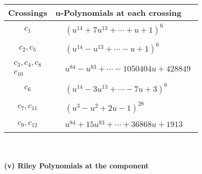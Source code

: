 \documentclass[1p]{elsarticle_modified}
\theoremstyle{definition}
\begin{document}
\begin{tabular}{m{50pt}|m{274pt}}
Crossings & \hspace{64pt}u-Polynomials at each crossing \\
\hline $$\begin{aligned}c_{1}\end{aligned}$$&$\begin{aligned}
&(u^{14}+7 u^{13}+\cdots+u+1)^{6}
\end{aligned}$\\
\hline $$\begin{aligned}c_{2},c_{5}\end{aligned}$$&$\begin{aligned}
&(u^{14}- u^{13}+\cdots- u+1)^{6}
\end{aligned}$\\
\hline $$\begin{aligned}c_{3},c_{4},c_{8}\\c_{10}\end{aligned}$$&$\begin{aligned}
&u^{84}- u^{83}+\cdots-1050404 u+428849
\end{aligned}$\\
\hline $$\begin{aligned}c_{6}\end{aligned}$$&$\begin{aligned}
&(u^{14}-3 u^{13}+\cdots-7 u+3)^{6}
\end{aligned}$\\
\hline $$\begin{aligned}c_{7},c_{11}\end{aligned}$$&$\begin{aligned}
&(u^3- u^2+2 u-1)^{28}
\end{aligned}$\\
\hline $$\begin{aligned}c_{9},c_{12}\end{aligned}$$&$\begin{aligned}
&u^{84}+15 u^{83}+\cdots+36868 u+1913
\end{aligned}$\\
\hline
\end{tabular}\\~\\
\newpage\renewcommand{\arraystretch}{1}
\flushleft \textbf{(v) Riley Polynomials at the component}\newline \\
\end{document}
